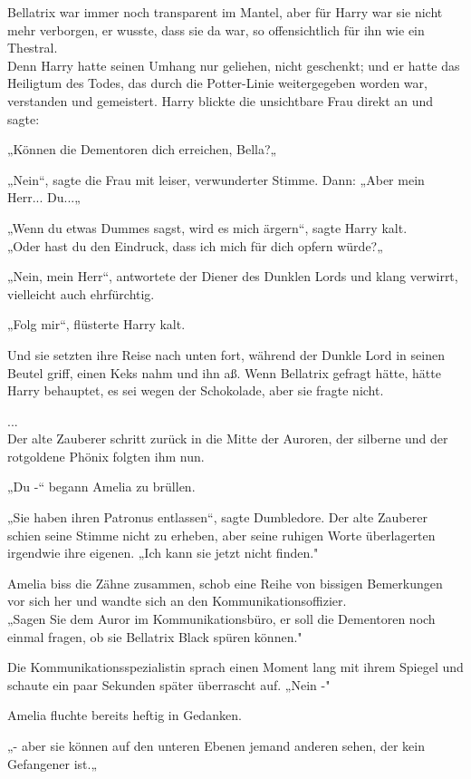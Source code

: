 {Bellatrix war immer noch transparent im Mantel, aber für Harry war sie nicht mehr verborgen, er wusste, dass sie da war, so offensichtlich für ihn wie ein Thestral.\\ Denn Harry hatte seinen Umhang nur geliehen, nicht geschenkt; und er hatte das Heiligtum des Todes, das durch die Potter-Linie weitergegeben worden war, verstanden und gemeistert. Harry blickte die unsichtbare Frau direkt an und sagte:

„Können die Dementoren dich erreichen, Bella?„

„Nein“, sagte die Frau mit leiser, verwunderter Stimme. Dann: „Aber mein Herr... Du...„

„Wenn du etwas Dummes sagst, wird es mich ärgern“, sagte Harry kalt.\\ „Oder hast du den Eindruck, dass ich mich für dich opfern würde?„

„Nein, mein Herr“, antwortete der Diener des Dunklen Lords und klang verwirrt, vielleicht auch ehrfürchtig.

„Folg mir“, flüsterte Harry kalt.

Und sie setzten ihre Reise nach unten fort, während der Dunkle Lord in seinen Beutel griff, einen Keks nahm und ihn aß. Wenn Bellatrix gefragt hätte, hätte Harry behauptet, es sei wegen der Schokolade, aber sie fragte nicht.

...\\ Der alte Zauberer schritt zurück in die Mitte der Auroren, der silberne und der rotgoldene Phönix folgten ihm nun.

„Du -“ begann Amelia zu brüllen.

„Sie haben ihren Patronus entlassen“, sagte Dumbledore. Der alte Zauberer schien seine Stimme nicht zu erheben, aber seine ruhigen Worte überlagerten irgendwie ihre eigenen. „Ich kann sie jetzt nicht finden."

Amelia biss die Zähne zusammen, schob eine Reihe von bissigen Bemerkungen vor sich her und wandte sich an den Kommunikationsoffizier.\\ „Sagen Sie dem Auror im Kommunikationsbüro, er soll die Dementoren noch einmal fragen, ob sie Bellatrix Black spüren können."

Die Kommunikationsspezialistin sprach einen Moment lang mit ihrem Spiegel und schaute ein paar Sekunden später überrascht auf. „Nein -"

Amelia fluchte bereits heftig in Gedanken.

„- aber sie können auf den unteren Ebenen jemand anderen sehen, der kein Gefangener ist.„

}
